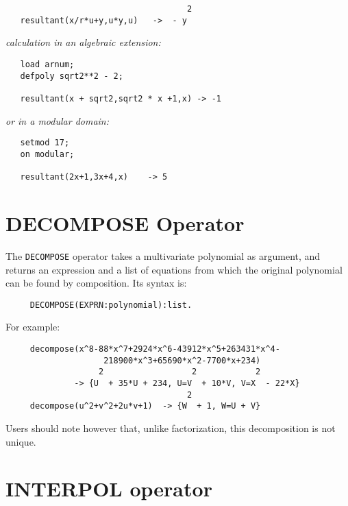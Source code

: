 \begin{samepage}
\begin{verbatim}
                                     2
   resultant(x/r*u+y,u*y,u)   ->  - y
\end{verbatim}
\end{samepage}

\textit{calculation in an algebraic extension:}

\begin{samepage}
\begin{verbatim}
   load arnum;
   defpoly sqrt2**2 - 2;

   resultant(x + sqrt2,sqrt2 * x +1,x) -> -1
\end{verbatim}
\end{samepage}

\textit{or in a modular domain:}

\begin{samepage}
\begin{verbatim}
   setmod 17;
   on modular;

   resultant(2x+1,3x+4,x)    -> 5
\end{verbatim}
\end{samepage}
\section{DECOMPOSE Operator}
\hypertarget{operator:DECOMPOSE}{}

The \texttt{DECOMPOSE} operator takes a multivariate polynomial as argument,
and returns an expression and a list of equations from which the
original polynomial can be found by composition.  Its syntax is:
\begin{verbatim}
     DECOMPOSE(EXPRN:polynomial):list.
\end{verbatim}
For example:
\begin{verbatim}
     decompose(x^8-88*x^7+2924*x^6-43912*x^5+263431*x^4-
                    218900*x^3+65690*x^2-7700*x+234)
                   2                  2            2
              -> {U  + 35*U + 234, U=V  + 10*V, V=X  - 22*X}
                                     2
     decompose(u^2+v^2+2u*v+1)  -> {W  + 1, W=U + V}
\end{verbatim}
Users should note however that, unlike factorization, this decomposition
is not unique.

\section{INTERPOL operator}
\hypertarget{operator:INTERPOL}{}

